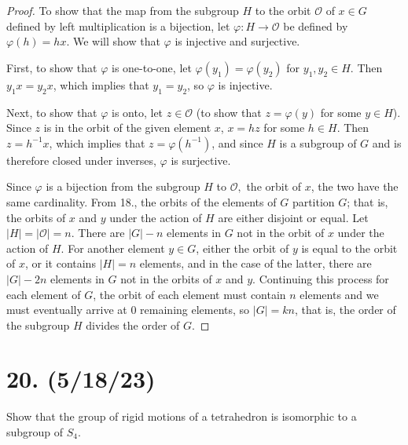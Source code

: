 \documentclass{article}
\begin{document}
\begin{proof}
  To show that the map from the subgroup $H$ to the orbit $\mathcal{O}$ of $x \in G$ defined by left multiplication is a bijection, let $\varphi: H \rightarrow \mathcal{O}$ be defined by $\varphi(h) = hx$. We will show that $\varphi$ is injective and surjective.

  First, to show that $\varphi$ is one-to-one, let $\varphi(y_1) = \varphi(y_2)$ for $y_1, y_2 \in H$. Then $y_1 x = y_2 x$, which implies that $y_1 = y_2$, so $\varphi$ is injective.

  Next, to show that $\varphi$ is onto, let $z \in \mathcal{O}$ (to show that $z = \varphi(y)$ for some $y \in H$). Since $z$ is in the orbit of the given element $x$, $x = hz$ for some $h \in H$. Then $z = h^{-1} x$, which implies that $z = \varphi(h^{-1})$, and since $H$ is a subgroup of $G$ and is therefore closed under inverses, $\varphi$ is surjective.

  Since $\varphi$ is a bijection from the subgroup $H$ to $\mathcal{O},$ the orbit of $x$, the two have the same cardinality. From 18., the orbits of the elements of $G$ partition $G$; that is, the orbits of $x$ and $y$ under the action of $H$ are either disjoint or equal. Let $|H| = |\mathcal{O}| = n$. There are $|G| - n$ elements in $G$ not in the orbit of $x$ under the action of $H$. For another element $y \in G$, either the orbit of $y$ is equal to the orbit of $x$, or it contains $|H| = n$ elements, and in the case of the latter, there are $|G| - 2n$ elements in $G$ not in the orbits of $x$ and $y$. Continuing this process for each element of $G$, the orbit of each element must contain $n$ elements and we must eventually arrive at 0 remaining elements, so $|G| = kn$, that is, the order of the subgroup $H$ divides the order of $G$.
\end{proof}

\section*{20. (5/18/23)}

Show that the group of rigid motions of a tetrahedron is isomorphic to a subgroup of $S_4$.
\end{document}
